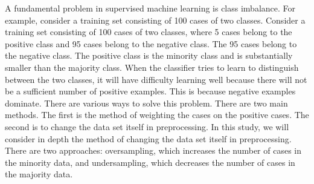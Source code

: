A fundamental problem in supervised machine learning is class imbalance.
For example, consider a training set consisting of 100 cases of two classes.
Consider a training set consisting of 100 cases of two classes, where 5 cases belong to the positive class and 95 cases belong to the negative class.
The 95 cases belong to the negative class. The positive class is the minority class and is substantially smaller than the majority class.
When the classifier tries to learn to distinguish between the two classes, it will have difficulty learning well because there will not be a sufficient number of positive examples.
This is because negative examples dominate. There are various ways to solve this problem.
There are two main methods.
The first is the method of weighting the cases on the positive cases.
The second is to change the data set itself in preprocessing.
In this study, we will consider in depth the method of changing the data set itself in preprocessing.
There are two approaches: oversampling, which increases the number of cases in the minority data, and undersampling, which decreases the number of cases in the majority data.
